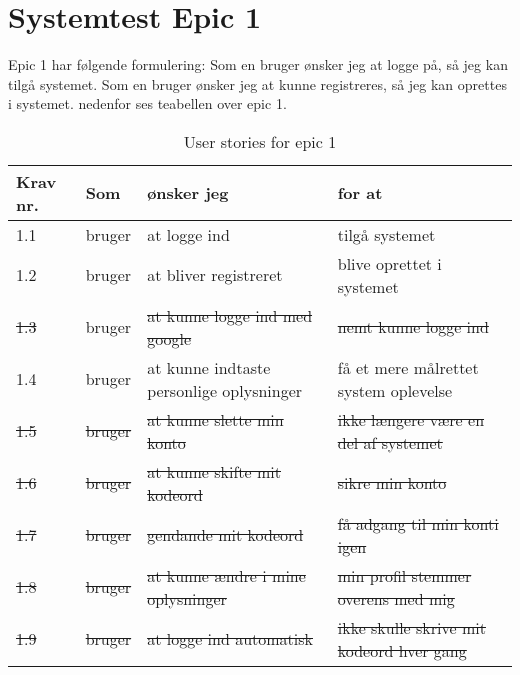 \chapter{Systemtest Epic 1}
Epic 1 har følgende formulering: 
Som en bruger ønsker jeg at logge på, så jeg kan tilgå systemet.
Som en bruger ønsker jeg at kunne registreres, så jeg kan oprettes i systemet.
nedenfor ses teabellen over epic 1.

\begin{table}[H]
    \centering
    \caption{User stories for epic 1}
    \label{tab:us-epic1}
    \begin{tabular}{p{1cm}|p{2cm}|p{6cm}|p{6cm}}
        \textbf{Krav nr.} & \textbf{Som} & \textbf{ønsker jeg}                      & \textbf{for at}                          \\
        \hline
        1.1               & bruger       & at logge ind                             & tilgå systemet                           \\
        \hline
        1.2               & bruger       & at bliver registreret                    & blive oprettet i systemet                \\
        \hline
        \sout{1.3}        & bruger       & \sout{at kunne logge ind med google}            & \sout{nemt kunne logge ind}        \\
        \hline
        1.4               & bruger       & at kunne indtaste personlige oplysninger & få et mere målrettet system oplevelse    \\
		\hline
     	\sout{1.5}        & \sout{bruger}       & \sout{at kunne slette min konto}  & \sout{ikke længere være en del af systemet}  \\ 
        \hline
		\sout{1.6}        & \sout{bruger}        & \sout{at kunne skifte mit kodeord}              & \sout{sikre min konto}           \\
        \hline
        \sout{1.7}        & \sout{bruger}        & \sout{gendande mit kodeord}                     & \sout{få adgang til min konti igen}             \\
        \hline
        \sout{1.8}        & \sout{bruger}        & \sout{at kunne ændre i mine oplysninger}        & \sout{min profil stemmer overens med mig}       \\
        \hline
        \sout{1.9}        & \sout{bruger}        & \sout{at logge ind automatisk}           & \sout{ikke skulle skrive mit kodeord hver gang} \\
    \end{tabular}
\end{table}


